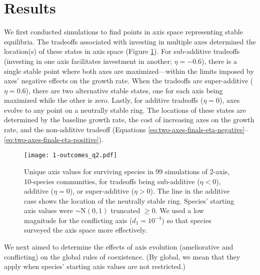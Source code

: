 \section*{Results}


We first conducted simulations to find points in axis space 
representing stable equilibria.
The tradeoffs associated with investing in multiple axes
determined the location(s) of these states in axis space
(Figure \ref{fig:two-axis-outcomes}).
For sub-additive tradeoffs 
(investing in one axis facilitates investment in another; $\eta = -0.6$), 
there is a single stable point where both axes are
maximized---within the limits imposed by axes' negative effects on 
the growth rate.
When the tradeoffs are super-additive ($\eta = 0.6$), there are two
alternative stable states, one for each axis being maximized while the 
other is zero.
Lastly, for additive tradeoffs ($\eta = 0$), axes
evolve to any point on a neutrally stable ring.
The locations of these states are determined by 
the baseline growth rate, 
the cost of increasing axes on the growth rate,
and the non-additive tradeoff
(Equations \ref{eq:two-axes-finals-eta-negative}--%
\ref{eq:two-axes-finals-eta-positive}).

\begin{figure}[ht!]
\centering
\texttt{[image: 1-outcomes\_q2.pdf]}
\caption{Unique axis values for surviving species in 99 simulations of 2-axis, 
    10-species communities,
    for tradeoffs being sub-additive ($\eta < 0$), additive ($\eta = 0$), or 
    super-additive ($\eta > 0$).
    The line in the additive case shows the location of the neutrally stable ring.
    Species' starting axis values were $\sim \text{N}(0,1)$ truncated $\ge 0$.
    We used a low magnitude for the conflicting axis ($d_1 = 10^{-4}$) 
    so that species surveyed the axis space more effectively.}
\label{fig:two-axis-outcomes}
\end{figure}


We next aimed to determine the effects of axis evolution (ameliorative and
conflicting) on the global rules of coexistence.
(By global, we mean that they apply when species' starting axis values are not
restricted.)



